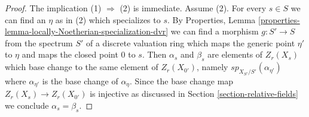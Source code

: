 \documentclass{stacks-project}
\theoremstyle{plain}
\theoremstyle{definition}
\theoremstyle{remark}
\numberwithin{equation}{subsection}
\begin{document}
\begin{proof}
The implication (1) $\Rightarrow$ (2) is immediate.
Assume (2). For every $s \in S$ we can find an $\eta$ as in (2)
which specializes to $s$. By
Properties, Lemma \ref{properties-lemma-locally-Noetherian-specialization-dvr}
we can find a morphism $g : S' \to S$ from the
spectrum $S'$ of a discrete valuation ring which maps
the generic point $\eta'$ to $\eta$ and maps
the closed point $0$ to $s$. Then $\alpha_s$ and $\beta_s$
are elements of $Z_r(X_s)$ which base change to the same
element of $Z_r(X_{0'})$, namely $sp_{X_{S'}/S'}(\alpha_{\eta'})$
where $\alpha_{\eta'}$ is the base change of $\alpha_\eta$.
Since the base change map $Z_r(X_s) \to Z_r(X_{0'})$ is injective
as discussed in Section \ref{section-relative-fields}
we conclude $\alpha_s = \beta_s$.
\end{proof}
\end{document}
